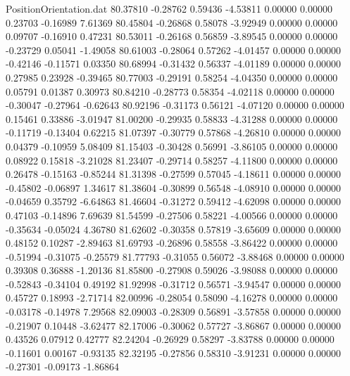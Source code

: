 \begin{filecontents}{PositionOrientation.dat}
  80.37810   -0.28762    0.59436    -4.53811    0.00000    0.00000    0.23703   -0.16989    7.61369
  80.45804   -0.26868    0.58078    -3.92949    0.00000    0.00000    0.09707   -0.16910    0.47231
  80.53011   -0.26168    0.56859    -3.89545    0.00000    0.00000   -0.23729    0.05041   -1.49058
  80.61003   -0.28064    0.57262    -4.01457    0.00000    0.00000   -0.42146   -0.11571    0.03350
  80.68994   -0.31432    0.56337    -4.01189    0.00000    0.00000    0.27985    0.23928   -0.39465
  80.77003   -0.29191    0.58254    -4.04350    0.00000    0.00000    0.05791    0.01387    0.30973
  80.84210   -0.28773    0.58354    -4.02118    0.00000    0.00000   -0.30047   -0.27964   -0.62643
  80.92196   -0.31173    0.56121    -4.07120    0.00000    0.00000    0.15461    0.33886   -3.01947
  81.00200   -0.29935    0.58833    -4.31288    0.00000    0.00000   -0.11719   -0.13404    0.62215
  81.07397   -0.30779    0.57868    -4.26810    0.00000    0.00000    0.04379   -0.10959    5.08409
  81.15403   -0.30428    0.56991    -3.86105    0.00000    0.00000    0.08922    0.15818   -3.21028
  81.23407   -0.29714    0.58257    -4.11800    0.00000    0.00000    0.26478   -0.15163   -0.85244
  81.31398   -0.27599    0.57045    -4.18611    0.00000    0.00000   -0.45802   -0.06897    1.34617
  81.38604   -0.30899    0.56548    -4.08910    0.00000    0.00000   -0.04659    0.35792   -6.64863
  81.46604   -0.31272    0.59412    -4.62098    0.00000    0.00000    0.47103   -0.14896    7.69639
  81.54599   -0.27506    0.58221    -4.00566    0.00000    0.00000   -0.35634   -0.05024    4.36780
  81.62602   -0.30358    0.57819    -3.65609    0.00000    0.00000    0.48152    0.10287   -2.89463
  81.69793   -0.26896    0.58558    -3.86422    0.00000    0.00000   -0.51994   -0.31075   -0.25579
  81.77793   -0.31055    0.56072    -3.88468    0.00000    0.00000    0.39308    0.36888   -1.20136
  81.85800   -0.27908    0.59026    -3.98088    0.00000    0.00000   -0.52843   -0.34104    0.49192
  81.92998   -0.31712    0.56571    -3.94547    0.00000    0.00000    0.45727    0.18993   -2.71714
  82.00996   -0.28054    0.58090    -4.16278    0.00000    0.00000   -0.03178   -0.14978    7.29568
  82.09003   -0.28309    0.56891    -3.57858    0.00000    0.00000   -0.21907    0.10448   -3.62477
  82.17006   -0.30062    0.57727    -3.86867    0.00000    0.00000    0.43526    0.07912    0.42777
  82.24204   -0.26929    0.58297    -3.83788    0.00000    0.00000   -0.11601    0.00167   -0.93135
  82.32195   -0.27856    0.58310    -3.91231    0.00000    0.00000   -0.27301   -0.09173   -1.86864

\end{filecontents}
